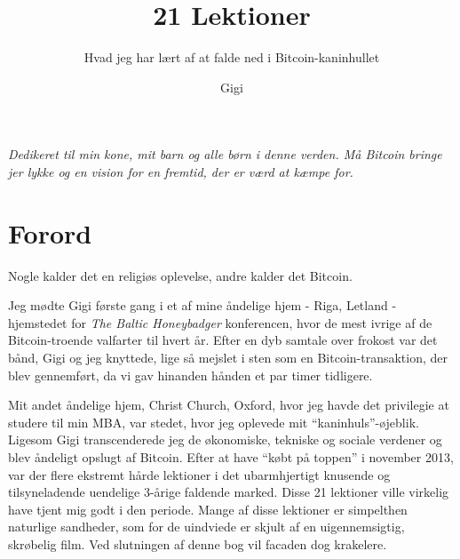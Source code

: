 \documentclass[paper=6in:9in,pagesize=pdftex,
               headinclude=on,footinclude=on,12pt]{scrbook}
\begin{document}
\frontmatter

\title{21 Lektioner}
\subtitle{Hvad jeg har lært af at falde ned i Bitcoin-kaninhullet}
\author{Gigi}
\date{}

\maketitle

\cleardoublepage

\newpage \vspace*{8cm}%

\thispagestyle{empty}
\begin{center}
  \Large \emph{ Dedikeret til min kone, mit barn og alle børn i denne verden. Må Bitcoin bringe jer lykke og en vision for en fremtid, der er værd at kæmpe for. } \end{center}

\chapter*{Forord}

Nogle kalder det en religiøs oplevelse, andre kalder det Bitcoin.

Jeg mødte Gigi første gang i et af mine åndelige hjem - Riga, Letland - hjemstedet for \textit{The Baltic Honeybadger} konferencen, hvor de mest ivrige af de Bitcoin-troende valfarter til hvert år. Efter en dyb samtale over frokost var det bånd, Gigi og jeg knyttede, lige så mejslet i sten som en Bitcoin-transaktion, der blev gennemført, da vi gav hinanden hånden et par timer tidligere.

Mit andet åndelige hjem, Christ Church, Oxford, hvor jeg havde det privilegie at studere til min MBA, var stedet, hvor jeg oplevede mit \enquote{kaninhuls}-øjeblik. Ligesom Gigi transcenderede jeg de økonomiske, tekniske og sociale verdener og blev åndeligt opslugt af Bitcoin. Efter at have \enquote{købt på toppen} i november 2013, var der flere ekstremt hårde lektioner i det ubarmhjertigt knusende og tilsyneladende uendelige 3-årige faldende marked. Disse 21 lektioner ville virkelig have tjent mig godt i den periode. Mange af disse lektioner er simpelthen naturlige sandheder, som for de uindviede er skjult af en uigennemsigtig, skrøbelig film. Ved slutningen af denne bog vil facaden dog krakelere.
\end{document}
